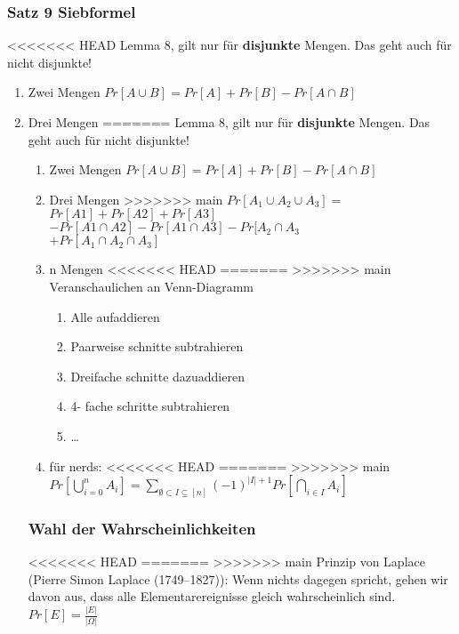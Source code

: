 \documentclass[11pt]{article}
\begin{document}
\subsubsection{Satz 9 Siebformel}
<<<<<<< HEAD
\label{sec:org030adde}
Lemma 8, gilt nur für \textbf{disjunkte} Mengen. Das geht auch für nicht disjunkte!
\begin{enumerate}
\item Zwei Mengen
\label{sec:orgba61ad3}
\(Pr[A \cup B] = Pr[A] + Pr[B] - Pr[A \cap B]\)
\item Drei Mengen
\label{sec:org1c3b6e0}
=======
\label{sec:org2f7cd6c}
Lemma 8, gilt nur für \textbf{disjunkte} Mengen. Das geht auch für nicht disjunkte!
\begin{enumerate}
\item Zwei Mengen
\label{sec:org40418f4}
\(Pr[A \cup B] = Pr[A] + Pr[B] - Pr[A \cap B]\)
\item Drei Mengen
\label{sec:org69111b7}
>>>>>>> main
\(Pr[A_1 \cup A_2 \cup A_3] =\) \\
\(Pr[A1] + Pr[A2] + Pr[A3]\) \\
\(- Pr[A1 \cap A2] - Pr[A1 \cap A3] - Pr[A_2 \cap A_3\) \\
\(+ Pr[A_1 \cap A_2 \cap A_3]\)
\item n Mengen
<<<<<<< HEAD
\label{sec:orgba151ce}
=======
\label{sec:org4d4979e}
>>>>>>> main
Veranschaulichen an Venn-Diagramm
\begin{enumerate}
\item Alle aufaddieren
\item Paarweise schnitte subtrahieren
\item Dreifache schnitte dazuaddieren
\item 4- fache schritte subtrahieren
\item \ldots{}
\end{enumerate}
\item für nerds:
<<<<<<< HEAD
\label{sec:orgba0eaf5}
=======
\label{sec:org2d2a9d9}
>>>>>>> main
\(Pr[\bigcup_{i=0}^n  A_i] = \sum_{\emptyset \subset I \subseteq [n]} (-1)^{|I|+1}Pr[\bigcap_{i \in I} A_i]\)
\end{enumerate}

\subsubsection{Wahl der Wahrscheinlichkeiten}
<<<<<<< HEAD
\label{sec:org429ac00}
=======
\label{sec:org83269b5}
>>>>>>> main
Prinzip von Laplace (Pierre Simon Laplace (1749–1827)): Wenn nichts dagegen spricht, gehen wir davon aus, dass alle Elementarereignisse gleich wahrscheinlich sind.
\(Pr[E] = \frac{|E|}{|\Omega|}\)


\end{enumerate}
\end{document}
